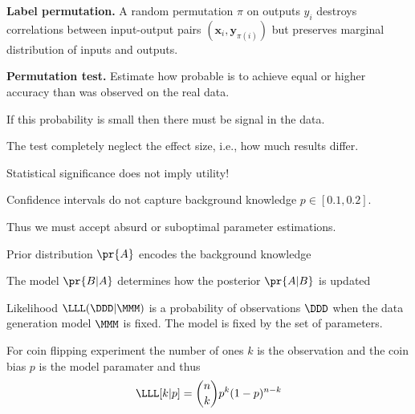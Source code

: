 \documentclass[landscape,footrule]{foils}
\renewcommand{\vec}[1]{\boldsymbol{#1}}
\begin{document}
\textbf{Label permutation.}
A random permutation $\pi$ on outputs $y_i$ destroys correlations between input-output pairs $(\vec{x}_{i}, \vec{y}_{\pi(i)})$ but preserves marginal distribution of inputs and outputs. 
\vspace*{2ex}


\textbf{Permutation test.}
Estimate how probable is to achieve equal or higher accuracy than was observed on the real data.
\begin{triangles}
\item If this probability is small then there must be signal in the data. 
\item The test completely neglect the effect size, i.e., how much results differ.
\item Statistical significance does not imply utility!      
\end{triangles}  






\begin{triangles}
\item Confidence intervals do not capture background knowledge $p\in[0.1,0.2]$. 
\item Thus we must accept absurd or suboptimal parameter estimations. 
\end{triangles}




\vspace*{1cm}
\begin{triangles}
\item Prior distribution $\pr{A}$ encodes the background knowledge
\item The model $\pr{B|A}$  determines how the posterior $\pr{A|B}$ is updated 
\end{triangles}


Likelihood $\LLL(\DDD|\MMM)$ is a probability of observations $\DDD$ when the data generation model $\MMM$ is fixed.
The model is fixed by the set of parameters.

For coin flipping experiment the number of ones $k$ is the observation and the coin bias $p$ is the model paramater and thus
\begin{align*}
\LLL[k|p]=\binom{n}{k}p^k(1-p)^{n-k}
\end{align*}
\end{document}
